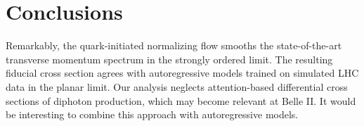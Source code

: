 \section{Conclusions}\label{sec:conclusions}

Remarkably, the quark-initiated normalizing flow smooths the
state-of-the-art transverse momentum spectrum in the strongly ordered
limit. The resulting fiducial cross section agrees with autoregressive
models trained on simulated LHC data in the planar limit. Our analysis
neglects attention-based differential cross sections of diphoton
production, which may become relevant at Belle II. It would be
interesting to combine this approach with autoregressive models.

